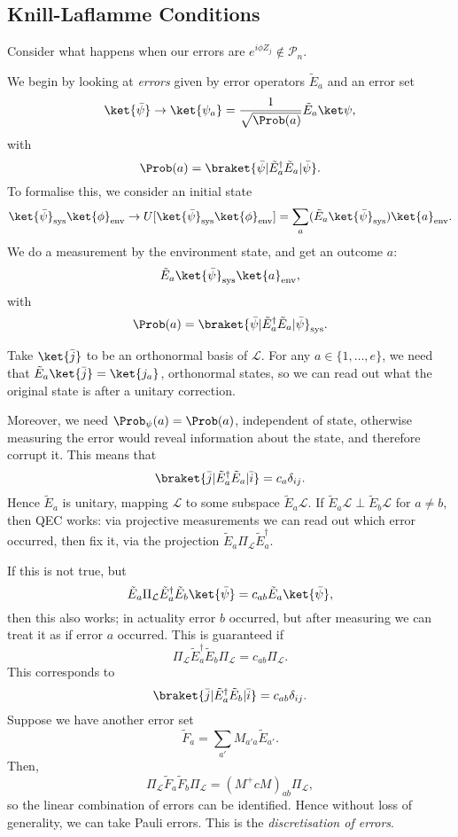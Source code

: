 \documentclass[12pt]{article}
\begin{document}
\subsection{Knill-Laflamme Conditions}%
\label{sub:klc}

Consider what happens when our errors are $e^{i \phi Z_j} \not \in \mathcal{P}_n$.

We begin by looking at \emph{errors} given by error operators $\tilde E_a$ and an error set 
\[
	\ket{\bar \psi} \to \ket{\psi_a} = \frac{1}{\sqrt{\Prob(a)}} \tilde E_a \ket \psi,
\]
with
\[
	\Prob(a) = \braket{\bar \psi| \tilde E_a^{\dagger} \tilde E_a | \bar \psi}.
\]
To formalise this, we consider an initial state
\[
	\ket{\bar \psi}_{\mathrm{sys}} \ket{\phi}_{\mathrm{env}} \to U [ \ket{\bar \psi}_{\mathrm{sys}} \ket{\phi}_{\mathrm{env}}] = \sum_a (\tilde E_a \ket{\bar \psi}_{\mathrm{sys}}) \ket{a}_{\mathrm{env}}.
\]
We do a measurement by the environment state, and get an outcome $a$:
\[
	\tilde E_a \ket{\bar \psi}_{\mathrm{sys}} \ket{a}_{\mathrm{env}},
\]
with
\[
	\Prob(a) = \braket{\bar \psi | \tilde E_a^{\dagger} \tilde E_a | \bar \psi}_{\mathrm{sys}}.
\]


Take $\ket{\bar j}$ to be an orthonormal basis of $\mathcal{L}$. For any $a \in \{1, \ldots, e\}$, we need that $\tilde E_a\ket{\bar j}=  \ket{j_a}$, orthonormal states, so we can read out what the original state is after a unitary correction.

Moreover, we need $\Prob_{\psi}(a) = \Prob(a)$, independent of state, otherwise measuring the error would reveal information about the state, and therefore corrupt it. This means that
\[
	\braket{\bar j | \tilde E_a^{\dagger} \tilde E_a | \bar i} = c_a \delta_{ij}.
\]
Hence $\tilde E_a$ is unitary, mapping $\mathcal{L}$ to some subspace $\tilde E_a \mathcal{L}$. If $\tilde E_a \mathcal{L} \perp \tilde E_b \mathcal{L}$ for $a \neq b$, then QEC works: via projective measurements we can read out which error occurred, then fix it, via the projection $\tilde E_a \Pi_{\mathcal{L}} \tilde E_a^{\dagger}$.

If this is not true, but
\[
	\tilde E_a \Pi_{\mathcal{L}} \tilde E_a^{\dagger} \tilde E_b \ket{\bar \psi} = c_{ab} \tilde E_a \ket{\bar \psi},
\]
then this also works; in actuality error $b$ occurred, but after measuring we can treat it as if error $a$ occurred. This is guaranteed if
\[
\Pi_{\mathcal{L}} \tilde E_a^{\dagger} \tilde E_b \Pi_{\mathcal{L}} = c_{ab} \Pi_{\mathcal{L}}.
\]
This corresponds to
\[
	\braket{\bar j | \tilde E_a^{\dagger} \tilde E_b | \bar i} = c_{ab} \delta_{ij}.
\]
Suppose we have another error set
\[
\tilde F_a = \sum_{a'} M_{a'a} \tilde E_{a'}.
\]
Then,
\[
\Pi_{\mathcal{L}} \tilde F_a \tilde F_b \Pi_{\mathcal{L}} = (M^{+} c M)_{ab} \Pi_{\mathcal{L}},
\]
so the linear combination of errors can be identified. Hence without loss of generality, we can take Pauli errors. This is the \emph{discretisation of errors}.
\end{document}
